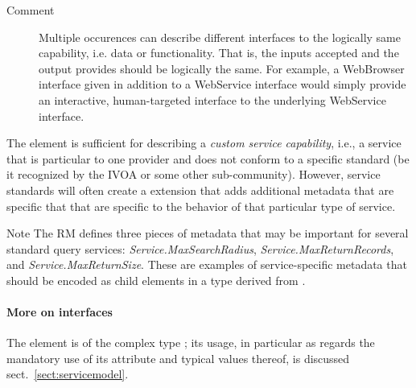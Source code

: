 \documentclass[11pt,a4paper]{ivoa}
\begin{document}
\begin{generated}
\begin{bigdescription}
\begin{description}
\item[Comment] 
                  Multiple occurences can describe different interfaces to 
                  the logically same capability, i.e. data or functionality.
                  That is, the inputs accepted and the output provides should
                  be logically the same.  For example, a WebBrowser interface
                  given in addition to a WebService interface would simply 
                  provide an interactive, human-targeted interface to the 
                  underlying WebService interface.  
               

\end{description}


\end{bigdescription}\endgroup

\endgroup
\end{generated}



The  element is sufficient for describing a
\emph{custom service capability}, i.e., a service that is
particular to one provider and does not conform to a specific standard 
(be it recognized by the IVOA or some other sub-community).  However,
service standards will often create a 
extension that adds additional metadata that are specific that that
are specific to the behavior of that particular type of service.  



\begin{admonition}{Note}
The RM defines three pieces of metadata that may be
important for several standard query services:
\emph{Service.MaxSearchRadius},
\emph{Service.MaxReturnRecords}, and
\emph{Service.MaxReturnSize}.  These are examples of
service-specific metadata that should be encoded as child
elements in a type derived from .  
\end{admonition}

\paragraph{More on interfaces}

The  element is of the complex type
; its usage, in particular as regards the mandatory
use of its  attribute and typical values thereof, is
discussed sect.~\ref{sect:servicemodel}.
\end{document}
